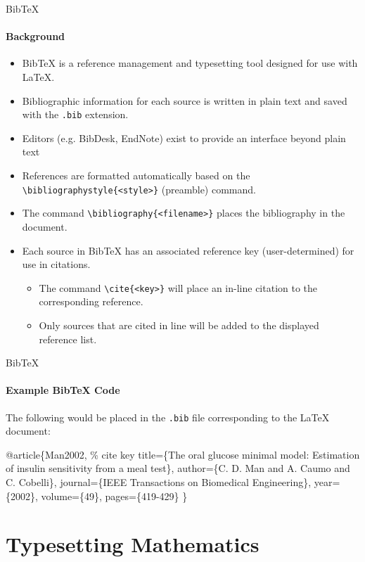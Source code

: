 \documentclass{beamer}
\begin{document}
\begin{frame}{BibTeX}
\framesubtitle{Background}
	\begin{itemize}
		\item BibTeX is a reference management and typesetting tool designed for use with LaTeX.
		\item<2-> Bibliographic information for each source is written in plain text and saved with the \texttt{.bib} extension.
		\item<3-> Editors (e.g. BibDesk, EndNote) exist to provide an interface beyond plain text
		\item<4-> References are formatted automatically based on the \texttt{\textbackslash bibliographystyle\{<style>\}} (preamble) command.
		\item<5-> The command \texttt{\textbackslash bibliography\{<filename>\}} places the bibliography in the document.
		\item<6-> Each source in BibTeX has an associated reference key (user-determined) for use in citations.
			\begin{itemize}
				\item The command \texttt{\textbackslash cite\{<key>\}} will place an in-line citation to the corresponding reference.
				\item Only sources that are cited in line will be added to the displayed reference list.
			\end{itemize}
	\end{itemize}
\end{frame}

\begin{frame}[fragile]{BibTeX}
\framesubtitle{Example BibTeX Code}
The following would be placed in the \texttt{.bib} file corresponding to the LaTeX document:
	\begin{exampleblock}{}
		\begin{semiverbatim}
			@article\{Man2002, \% cite key
			title=\{The oral glucose minimal model: Estimation of insulin sensitivity from a meal test\},
			author=\{C. D. Man and A. Caumo and C. Cobelli\},
			journal=\{IEEE Transactions on Biomedical Engineering\},
			year=\{2002\},
			volume=\{49\},
			pages=\{419-429\}
			\}
		\end{semiverbatim}
	\end{exampleblock}
\end{frame}

\section{Typesetting Mathematics} %
\end{document}
